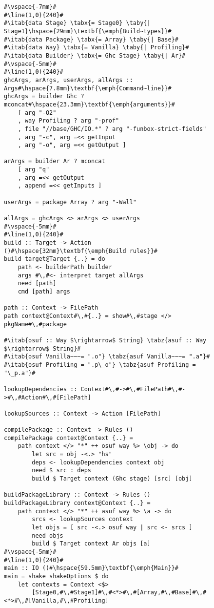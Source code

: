 \begin{figure}
\begin{lstlisting}
#\vspace{-7mm}#
#\line(1,0){240}#
#\itab{data Stage} \tabx{= Stage0} \taby{| Stage1}\hspace{29mm}\textbf{\emph{Build~types}}#
#\itab{data Package} \tabx{= Array} \taby{| Base}#
#\itab{data Way} \tabx{= Vanilla} \taby{| Profiling}#
#\itab{data Builder} \tabx{= Ghc Stage} \taby{| Ar}#
#\vspace{-5mm}#
#\line(1,0){240}#
ghcArgs, arArgs, userArgs, allArgs :: Args#\hspace{7.8mm}\textbf{\emph{Command~line}}#
ghcArgs = builder Ghc ? mconcat#\hspace{23.3mm}\textbf{\emph{arguments}}#
    [ arg "-O2"
    , way Profiling ? arg "-prof"
    , file "//base/GHC/IO.*" ? arg "-funbox-strict-fields" 
    , arg "-c", arg =<< getInput 
    , arg "-o", arg =<< getOutput ]

arArgs = builder Ar ? mconcat
    [ arg "q"
    , arg =<< getOutput
    , append =<< getInputs ]

userArgs = package Array ? arg "-Wall"

allArgs = ghcArgs <> arArgs <> userArgs
#\vspace{-5mm}#
#\line(1,0){240}#
build :: Target -> Action ()#\hspace{32mm}\textbf{\emph{Build rules}}#
build target@Target {..} = do
    path <- builderPath builder
    args #\,#<- interpret target allArgs
    need [path]
    cmd [path] args

path :: Context -> FilePath
path context@Context#\,#{..} = show#\,#stage </> pkgName#\,#package

#\itab{osuf :: Way $\rightarrow$ String} \tabz{asuf :: Way $\rightarrow$ String}#
#\itab{osuf Vanilla~~~= ".o"} \tabz{asuf Vanilla~~~= ".a"}#
#\itab{osuf Profiling = ".p\_o"} \tabz{asuf Profiling = "\_p.a"}#

lookupDependencies :: Context#\,#->#\,#FilePath#\,#->#\,#Action#\,#[FilePath]

lookupSources :: Context -> Action [FilePath]

compilePackage :: Context -> Rules ()
compilePackage context@Context {..} = 
    path context </> "*" ++ osuf way %> \obj -> do
        let src = obj -<.> "hs"
        deps <- lookupDependencies context obj
        need $ src : deps
        build $ Target context (Ghc stage) [src] [obj]

buildPackageLibrary :: Context -> Rules ()
buildPackageLibrary context@Context {..} = 
    path context </> "*" ++ asuf way %> \a -> do
        srcs <- lookupSources context
        let objs = [ src -<.> osuf way | src <- srcs ]
        need objs
        build $ Target context Ar objs [a]
#\vspace{-5mm}#
#\line(1,0){240}#
main :: IO ()#\hspace{59.5mm}\textbf{\emph{Main}}#
main = shake shakeOptions $ do
    let contexts = Context <$> 
        [Stage0,#\,#Stage1]#\,#<*>#\,#[Array,#\,#Base]#\,#<*>#\,#[Vanilla,#\,#Profiling]
  

\end{lstlisting}
\end{figure}
